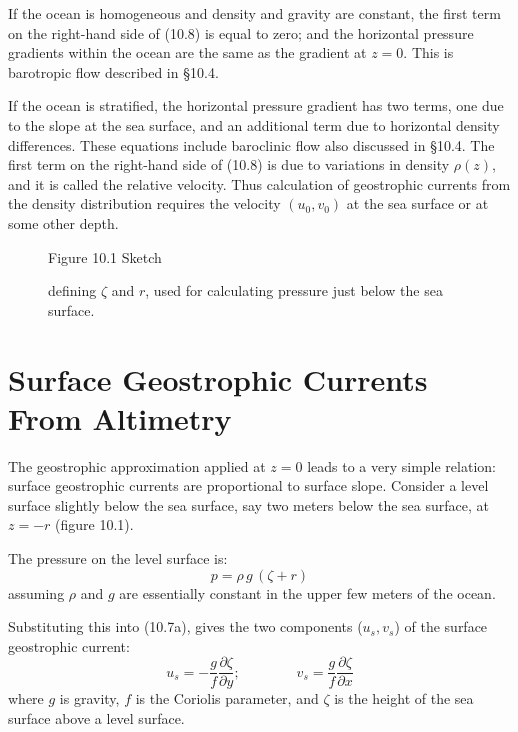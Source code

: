 If the ocean is homogeneous and density and gravity are constant, the
first term on the right-hand side of (10.8) is equal to zero; and the
horizontal pressure gradients within the ocean are the same as the
gradient at $z = 0$. This is barotropic flow described in \S10.4.

If the ocean is stratified, the horizontal pressure gradient has two
terms, one due to the slope at the sea surface, and an additional term
due to horizontal density differences. These equations include
baroclinic flow also discussed in \S10.4. The first term on the
right-hand side of (10.8) is due to variations in density $\rho (z)$,
and it is called the relative velocity. Thus calculation of
geostrophic currents from the density distribution requires the
velocity $\left(u_0, v_0\right)$ at the sea surface or at some other
depth.

\begin{figure}[h!]
\centering
\footnotesize
Figure 10.1 Sketch \rule{0mm}{3ex}defining $\zeta$ and $r$, used for
calculating pressure just below the sea surface.

\label{fig:surfacesketch}
\vspace{-3ex}
\end{figure}

\section{Surface Geostrophic Currents From Altimetry}
The geostrophic approximation applied at $z = 0$ leads
to a very simple relation: surface geostrophic currents are
proportional to surface slope. Consider a level surface slightly below the sea surface, say two meters below the
sea surface, at $z = -r$ (figure 10.1).

The pressure on the level surface is:
\begin{equation}
p = \rho\,g\,\left(\zeta + r\right)
\end{equation}
assuming $\rho$ and $g$ are essentially constant in the upper few
meters of the ocean.

Substituting this into (10.7a), gives the two components ($u_s, v_s$)
of the surface geostrophic current:
\begin{equation}
u_s =-\frac{g}{f}\frac{\partial\zeta}{\partial y}; \qquad \qquad
v_s =\frac{g}{f}\frac{\partial\zeta}{\partial x}
\end{equation}
where $g$ is gravity, $f$ is the Coriolis parameter, and $\zeta$ is the height of the sea surface above a
level surface.

